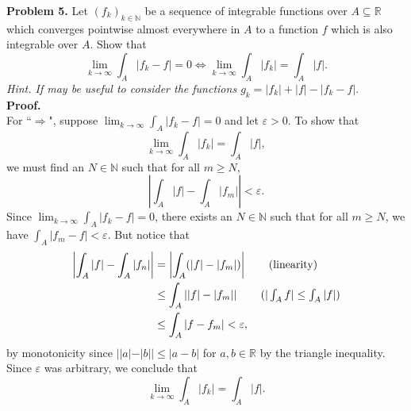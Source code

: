 \noindent \textbf{Problem 5.} Let \( (f_{k} )_{k \in \mathbb{N} } \) be a sequence of integrable functions over \( A \subseteq \mathbb{R} \) which converges pointwise almost everywhere in \( A \) to a function \( f \) which is also integrable over \( A \). Show that \[ \lim_{{k} \to {\infty}} \int_{A} |f_{k} - f| = 0 \iff \lim_{{k} \to {\infty}} \int_{A} |f_{k}| = \int_{A} |f|.   \] \emph{Hint. If may be useful to consider the functions \( g _{k } = |f_{k} | + |f | - |f_{k} - f|. \)} \\

\noindent \textbf{Proof.} \\
For ``$\Rightarrow$", suppose \( \lim_{{k} \to {\infty}} \int_{A} |f_{k} - f| = 0 \) and let \( \varepsilon > 0 \). To show that \[\lim_{{k} \to {\infty}} \int_{A} |f_{k}| = \int_{A} |f|, \] we must find an \( N \in \mathbb{N}  \) such that for all \( m \geq N \), \[\left | {\int_{A} |f| - \int_{A} |f_m|} \right | < \varepsilon .\] Since \( \lim_{{k} \to {\infty}} \int_{A} |f_{k} - f| = 0 \), there exists an \( N \in \mathbb{N}  \) such that for all \( m \geq N \), we have \( \int_{A} |f_{m} - f| < \varepsilon  \). But notice that
\begin{align*}
	\left | {\int_{A} |f| - \int_{A} |f_{n}| } \right |  &= \left | {\int_{A} (|f| - |f_{m}| )} \right | \tag{linearity} \\
							     &\leq \int_{A} \left | {|f| - |f_{m} |} \right | \tag{\( |\int_{A} f| \leq \int_{A} |f| \)} \\
							     &\leq \int_{A} |f - f_{m} | < \varepsilon,
\end{align*}
by monotonicity since \( ||a|-|b|| \leq |a-b| \) for \( a,b \in \mathbb{R} \) by the triangle inequality. Since \( \varepsilon  \) was arbitrary, we conclude that \[\lim_{{k} \to {\infty}} \int_{A} |f_{k} | = \int_{A} |f|.\]


